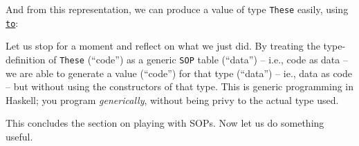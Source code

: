 \begin{Shaded}
\begin{Highlighting}[]
\OperatorTok{\textgreater{}} \OtherTok{=}   \OperatorTok{:*}   \OperatorTok{:*} \OtherTok{ ::}  \NormalTok{ \textquotesingle{}[}\NormalTok{, }\NormalTok{]}
\OperatorTok{\textgreater{}}   \OtherTok{=}  \OperatorTok{$}  \OperatorTok{$}   \NormalTok{ \textquotesingle{}[[}\NormalTok{], [}\NormalTok{], [}\NormalTok{, }\NormalTok{]]}
\OperatorTok{\textgreater{}} \OperatorTok{:} 
\OtherTok{ ::} \NormalTok{ (} \NormalTok{) \textquotesingle{}[[}\NormalTok{], [}\NormalTok{], [}\NormalTok{, }\NormalTok{]]}
\end{Highlighting}
\end{Shaded}

And from this representation, we can produce a value of type
\texttt{These} easily, using
\href{https://hackage.haskell.org/package/generics-sop-0.5.1.2/docs/Generics-SOP.html\#v:to}{\texttt{to}}:

\begin{Shaded}
\begin{Highlighting}[]
\OperatorTok{\textgreater{}}\NormalTok{(}  \NormalTok{) (} \NormalTok{)}
  
\end{Highlighting}
\end{Shaded}

Let us stop for a moment and reflect on what we just did. By treating
the type-definition of \texttt{These} (``code'') as a generic
\texttt{SOP} table (``data'') -- i.e., code as data -- we are able to
generate a value (``code'') for that type (``data'') -- ie., data as
code -- but without using the constructors of that type. This is generic
programming in Haskell; you program \emph{generically}, without being
privy to the actual type used.

This concludes the section on playing with SOPs. Now let us do something
useful.

